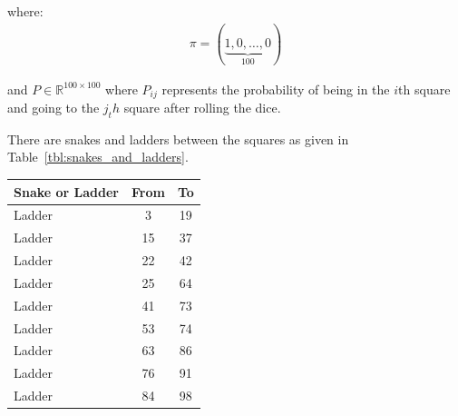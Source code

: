 where:
\begin{equation*}
\begin{split}
\pi = (\underbrace{1, 0, \dots, 0}_{100})
\end{split}
\end{equation*}

and \(P\in\mathbb{R}^{100 \times 100}\) where \(P_{ij}\) represents the
probability of being in the \(i\)th square and going to the \(j_th\) square
after rolling the dice.


There are snakes and ladders between the squares as given in
Table~\ref{tbl:snakes_and_ladders}.


\begin{table}[!hbtp]
\begin{tabular}{l|c|c}
\hline

Snake or Ladder
&

From
&

To
\\
\midrule

Ladder
&

3
&

19
\\
Ladder
&

15
&

37
\\

Ladder
&

22
&

42
\\

Ladder
&

25
&

64
\\

Ladder
&

41
&

73
\\

Ladder
&

53
&

74
\\

Ladder
&

63
&

86
\\

Ladder
&

76
&

91
\\

Ladder
&

84
&

98
\\


\end{tabular}
\end{table}
